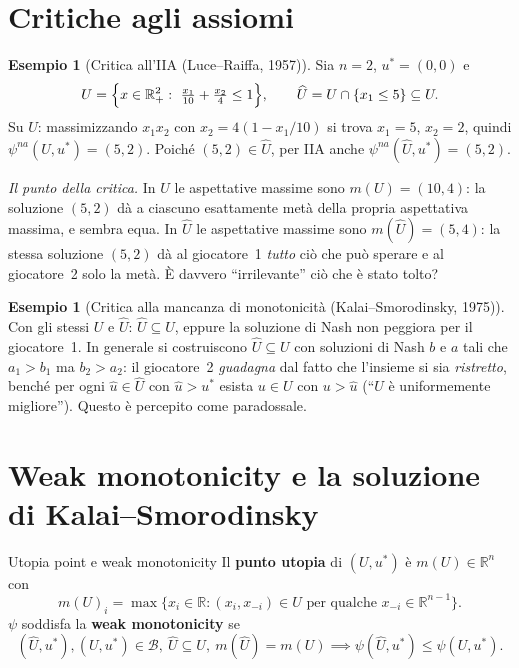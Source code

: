 \documentclass[12pt,a4paper,twoside]{book}
\theoremstyle{plain}
\theoremstyle{definition}
\newtheorem{example}[theorem]{Esempio}
\begin{document}
\section{Critiche agli assiomi}

\begin{example}[Critica all'IIA (Luce--Raiffa, 1957)]
Sia $n=2$, $u^*=(0,0)$ e
\[
  U=\Bigl\{x\in\mathbb{R}^2_+:\ \tfrac{x_1}{10}+\tfrac{x_2}{4}\le 1\Bigr\},
  \qquad
  \widehat U=U\cap\{x_1\le 5\}\subseteq U .
\]
Su $U$: massimizzando $x_1x_2$ con $x_2=4(1-x_1/10)$ si trova $x_1=5$, $x_2=2$, quindi
$\psi^{na}(U,u^*)=(5,2)$. Poiché $(5,2)\in\widehat U$, per IIA anche
$\psi^{na}(\widehat U,u^*)=(5,2)$.

\emph{Il punto della critica.} In $U$ le aspettative massime sono $m(U)=(10,4)$: la
soluzione $(5,2)$ dà a ciascuno esattamente metà della propria aspettativa massima, e
sembra equa. In $\widehat U$ le aspettative massime sono $m(\widehat U)=(5,4)$: la stessa
soluzione $(5,2)$ dà al giocatore~1 \emph{tutto} ciò che può sperare e al giocatore~2
solo la metà. È davvero ``irrilevante'' ciò che è stato tolto?
\end{example}

\begin{example}[Critica alla mancanza di monotonicità (Kalai--Smorodinsky, 1975)]
Con gli stessi $U$ e $\widehat U$: $\widehat U\subseteq U$, eppure la soluzione di Nash non
peggiora per il giocatore~1. In generale si costruiscono $\widehat U\subseteq U$ con
soluzioni di Nash $b$ e $a$ tali che $a_1>b_1$ ma $b_2>a_2$: il giocatore~2 \emph{guadagna}
dal fatto che l'insieme si sia \emph{ristretto}, benché per ogni $\hat u\in\widehat U$ con
$\hat u>u^*$ esista $u\in U$ con $u>\hat u$ (``$U$ è uniformemente migliore''). Questo è
percepito come paradossale.
\end{example}

\section{Weak monotonicity e la soluzione di Kalai--Smorodinsky}

\begin{defbox}{Utopia point e weak monotonicity}
Il \textbf{punto utopia} di $(U,u^*)$ è $m(U)\in\mathbb{R}^n$ con
\[
  m(U)_i=\max\{x_i\in\mathbb{R} : (x_i,x_{-i})\in U \text{ per qualche } x_{-i}\in\mathbb{R}^{n-1}\}.
\]
$\psi$ soddisfa la \textbf{weak monotonicity} se
\[
  (\widehat U,u^*),(U,u^*)\in\mathcal{B},\ \widehat U\subseteq U,\ m(\widehat U)=m(U)
  \implies \psi(\widehat U,u^*)\le\psi(U,u^*).
\]
\end{defbox}
\end{document}
